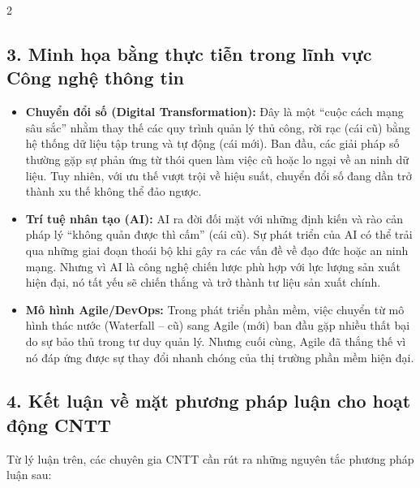 \documentclass[9pt,a4paper]{extarticle}
\begin{document}
\begin{multicols*}{2}
\subsection*{3. Minh họa bằng thực tiễn trong lĩnh vực Công nghệ thông tin}

\begin{itemize}
\item \textbf{Chuyển đổi số (Digital Transformation):} Đây là một ``cuộc cách mạng sâu sắc'' nhằm thay thế các quy trình quản lý thủ công, rời rạc (cái cũ) bằng hệ thống dữ liệu tập trung và tự động (cái mới). Ban đầu, các giải pháp số thường gặp sự phản ứng từ thói quen làm việc cũ hoặc lo ngại về an ninh dữ liệu. Tuy nhiên, với ưu thế vượt trội về hiệu suất, chuyển đổi số đang dần trở thành xu thế không thể đảo ngược.
\item \textbf{Trí tuệ nhân tạo (AI):} AI ra đời đối mặt với những định kiến và rào cản pháp lý ``không quản được thì cấm'' (cái cũ). Sự phát triển của AI có thể trải qua những giai đoạn thoái bộ khi gây ra các vấn đề về đạo đức hoặc an ninh mạng. Nhưng vì AI là công nghệ chiến lược phù hợp với lực lượng sản xuất hiện đại, nó tất yếu sẽ chiến thắng và trở thành tư liệu sản xuất chính.
\item \textbf{Mô hình Agile/DevOps:} Trong phát triển phần mềm, việc chuyển từ mô hình thác nước (Waterfall -- cũ) sang Agile (mới) ban đầu gặp nhiều thất bại do sự bảo thủ trong tư duy quản lý. Nhưng cuối cùng, Agile đã thắng thế vì nó đáp ứng được sự thay đổi nhanh chóng của thị trường phần mềm hiện đại.
\end{itemize}

\subsection*{4. Kết luận về mặt phương pháp luận cho hoạt động CNTT}

Từ lý luận trên, các chuyên gia CNTT cần rút ra những nguyên tắc phương pháp luận sau:


\end{multicols*}
\end{document}

